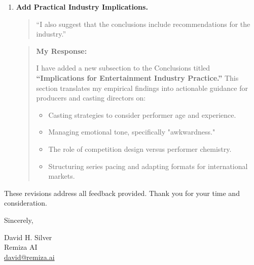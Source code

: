 \documentclass[11pt]{article}
\newenvironment{comment}{%
  \begin{quote}\em\noindent\ignorespaces%
}{%
  \end{quote}%
}
\newenvironment{response}{%
  \begin{quote}\noindent\textbf{My Response:}\par\medskip\noindent\ignorespaces%
}{%
  \end{quote}%
}
\begin{document}
\begin{enumerate}[label=\textbf{Reviewer Comment \arabic*:}, wide, labelwidth=!, labelindent=0pt, leftmargin=*]
    \item \textbf{Add Practical Industry Implications.}
        \begin{comment}
        “I also suggest that the conclusions include recommendations for the industry.”
        \end{comment}
        \begin{response}
        I have added a new subsection to the Conclusions titled \textbf{“Implications for Entertainment Industry Practice.”} This section translates my empirical findings into actionable guidance for producers and casting directors on:
        \begin{itemize}
            \item Casting strategies to consider performer age and experience.
            \item Managing emotional tone, specifically "awkwardness."
            \item The role of competition design versus performer chemistry.
            \item Structuring series pacing and adapting formats for international markets.
        \end{itemize}
        \end{response}

\end{enumerate}

\vspace{1cm}

These revisions address all feedback provided. Thank you for your time and consideration.

\vspace{0.5cm}

Sincerely,

\vspace{1cm}

David H. Silver\\
Remiza AI\\
\href{mailto:david@remiza.ai}{david@remiza.ai}
\end{document}
